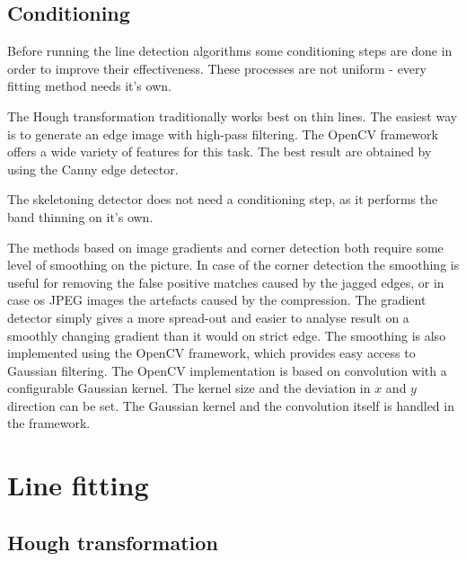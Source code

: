 \subsection{Conditioning}

Before running the line detection algorithms some conditioning steps are done in order to improve their effectiveness.
These processes are not uniform - every fitting method needs it's own.

The Hough transformation traditionally works best on thin lines.
The easiest way is to generate an edge image with high-pass filtering.
The OpenCV framework offers a wide variety of features for this task.
The best result are obtained by using the Canny edge detector.

The skeletoning detector does not need a conditioning step, as it performs the band thinning on it's own.

The methods based on image gradients and corner detection both require some level of smoothing on the picture.
In case of the corner detection the smoothing is useful for removing the false positive matches caused by the jagged edges, or in case os JPEG images the artefacts caused by the compression.
The gradient detector simply gives a more spread-out and easier to analyse result on a smoothly changing gradient than it would on strict edge.
The smoothing is also implemented using the OpenCV framework, which provides easy access to Gaussian filtering.
The OpenCV implementation is based on convolution with a configurable Gaussian kernel.
The kernel size and the deviation in $x$ and $y$ direction can be set.
The Gaussian kernel and the convolution itself is handled in the framework.

\section{Line fitting}



\subsection{Hough transformation}

